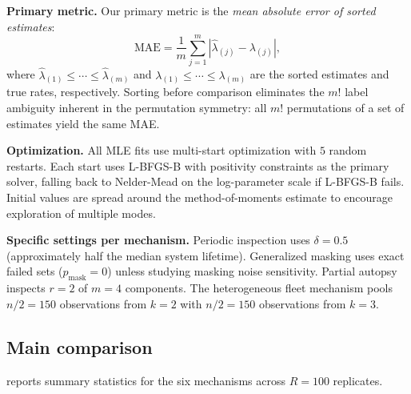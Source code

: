 \documentclass[12pt]{article}
\newcommand{\MAE}{\mathrm{MAE}}
\begin{document}
\textbf{Primary metric.}
Our primary metric is the \emph{mean absolute error of sorted estimates}:
\begin{equation}\label{eq:mae}
  \MAE = \frac{1}{m} \sum_{j=1}^{m}
    |\hat{\lambda}_{(j)} - \lambda_{(j)}|,
\end{equation}
where $\hat{\lambda}_{(1)} \leq \cdots \leq \hat{\lambda}_{(m)}$ and
$\lambda_{(1)} \leq \cdots \leq \lambda_{(m)}$ are the sorted estimates
and true rates, respectively.  Sorting before comparison eliminates the
$m!$ label ambiguity inherent in the permutation symmetry: all $m!$
permutations of a set of estimates yield the same MAE.

\textbf{Optimization.}
All MLE fits use multi-start optimization with $5$ random restarts.
Each start uses L-BFGS-B with positivity constraints as the primary
solver, falling back to Nelder-Mead on the log-parameter scale if
L-BFGS-B fails.  Initial values are spread around the method-of-moments
estimate to encourage exploration of multiple modes.

\textbf{Specific settings per mechanism.}
Periodic inspection uses $\delta = 0.5$ (approximately half the median
system lifetime).  Generalized masking uses exact failed sets
($p_{\text{mask}} = 0$) unless studying masking noise sensitivity.
Partial autopsy inspects $r = 2$ of $m = 4$ components.  The
heterogeneous fleet mechanism pools $n/2 = 150$ observations from $k = 2$
with $n/2 = 150$ observations from $k = 3$.

\subsection{Main comparison}\label{sec:main-comparison}

 reports summary statistics for the six mechanisms
across $R = 100$ replicates.
\end{document}
